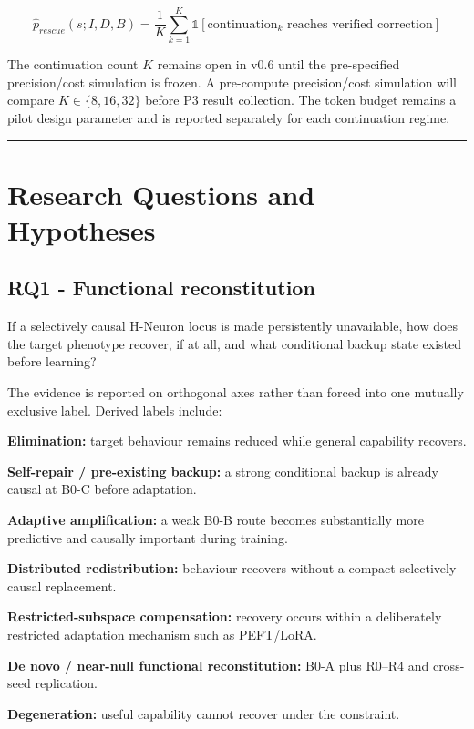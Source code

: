 \[
\hat{p}_{rescue}(s;I,D,B) = \frac{1}{K}\sum_{k=1}^{K} \mathbb{1}[\text{continuation}_k \text{ reaches verified correction}]
\]

The continuation count \(K\) remains open in v0.6 until the pre-specified precision/cost simulation is frozen. A pre-compute precision/cost simulation will compare \(K\in\{8,16,32\}\) before P3 result collection. The token budget remains a pilot design parameter and is reported separately for each continuation regime.

\begin{center}\rule{0.5\linewidth}{0.5pt}\end{center}

\section{Research Questions and Hypotheses}\label{research-questions-and-hypotheses}

\subsection{RQ1 - Functional reconstitution}\label{rq1---functional-reconstitution}

If a selectively causal H-Neuron locus is made persistently unavailable, how does the target phenotype recover, if at all, and what conditional backup state existed before learning?

The evidence is reported on orthogonal axes rather than forced into one mutually exclusive label. Derived labels include:

\textbf{Elimination:} target behaviour remains reduced while general capability recovers.

\textbf{Self-repair / pre-existing backup:} a strong conditional backup is already causal at B0-C before adaptation.

\textbf{Adaptive amplification:} a weak B0-B route becomes substantially more predictive and causally important during training.

\textbf{Distributed redistribution:} behaviour recovers without a compact selectively causal replacement.

\textbf{Restricted-subspace compensation:} recovery occurs within a deliberately restricted adaptation mechanism such as PEFT/LoRA.

\textbf{De novo / near-null functional reconstitution:} B0-A plus R0--R4 and cross-seed replication.

\textbf{Degeneration:} useful capability cannot recover under the constraint.

